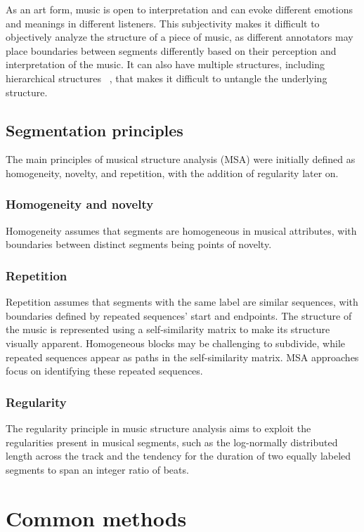 As an art form, music is open to interpretation and can evoke different emotions and meanings in different listeners. This subjectivity makes it difficult to objectively analyze the structure of a piece of music, as different annotators may place boundaries between segments differently based on their perception and interpretation of the music. It can also have multiple structures, including hierarchical structures ~\cite{hiererchical}, that makes it difficult to untangle the underlying structure.

\subsection{Segmentation principles}
The main principles of musical structure analysis (MSA) were initially defined as homogeneity, novelty, and repetition, with the addition of regularity later on. 

\subsubsection{Homogeneity and novelty}
Homogeneity assumes that segments are homogeneous in musical attributes, with boundaries between distinct segments being points of novelty. 

\subsubsection{Repetition}
Repetition assumes that segments with the same label are similar sequences, with boundaries defined by repeated sequences' start and endpoints. The structure of the music is represented using a self-similarity matrix to make its structure visually apparent. Homogeneous blocks may be challenging to subdivide, while repeated sequences appear as paths in the self-similarity matrix. MSA approaches focus on identifying these repeated sequences.

\subsubsection{Regularity}
The regularity principle in music structure analysis aims to exploit the regularities present in musical segments, such as the log-normally distributed length across the track and the tendency for the duration of two equally labeled segments to span an integer ratio of beats.

\section{Common methods}

